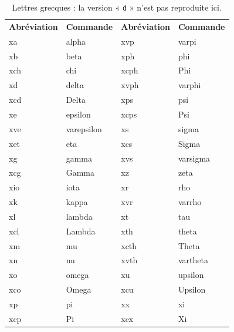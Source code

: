 \documentclass[11pt,french]{article}
\begin{document}
\begin{table}[H]
\small\centering
\begin{tabular}{llll}
\textbf{Abréviation} & \textbf{Commande} & \textbf{Abréviation} & \textbf{Commande} \\
\cmidrule[0.5pt](lr){1-1} \cmidrule[0.5pt](lr){2-2} \cmidrule[0.5pt](lr){3-3} \cmidrule[0.5pt](lr){4-4}
xa  & alpha      & xvp  & varpi \\
xb  & beta       & xph  & phi \\
xch & chi        & xcph & Phi \\
xd  & delta      & xvph & varphi \\
xcd & Delta      & xps  & psi \\
xe  & epsilon    & xcps & Psi \\
xve & varepsilon & xs   & sigma \\
xet & eta        & xcs  & Sigma \\
xg  & gamma      & xvs  & varsigma \\
xcg & Gamma      & xz   & zeta \\
xio & iota       & xr   & rho \\
xk  & kappa      & xvr  & varrho \\
xl  & lambda     & xt   & tau \\
xcl & Lambda     & xth  & theta \\
xm  & mu         & xcth & Theta \\
xn  & nu         & xvth & vartheta \\
xo  & omega      & xu   & upsilon \\
xco & Omega      & xcu  & Upsilon \\
xp  & pi         & xx   & xi \\
xcp & Pi         & xcx  & Xi \\
\end{tabular}
\caption{Lettres grecques : la version « \texttt{d} » n'est pas reproduite ici.}
\label{tblgreek}
\end{table}


\end{document}
